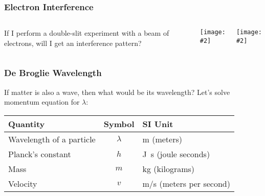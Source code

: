 \documentclass[12pt,compress,aspectratio=169]{beamer}
\newcommand{\pic}[2]{\texttt{[image: \#2]}}
\begin{document}
\begin{frame}
  \frametitle{Electron Interference}
  \begin{columns}
    If I perform a double-slit experiment with a beam of electrons, will I get
    an interference pattern?
    \begin{center}
      \pic{.7}{CNX_Chem_06_03_Electrnin.jpg}
    \end{center}

    \pic{1}{206px-Double-slit_experiment_results_Tanamura_2.jpg}
  \end{columns}
\end{frame}



\begin{frame}
  \frametitle{De Broglie Wavelength}
  If matter is also a wave, then what would be its wavelength? Let's solve
  momentum equation for $\lambda$:


  \vspace{-.1in}
  \begin{center}
    \begin{tabular}{l|c|l}
      \rowcolor{pink}
      \textbf{Quantity} & \textbf{Symbol} & \textbf{SI Unit} \\ \hline
      Wavelength of a particle & $\lambda$ & \si{\metre} (meters) \\
      Planck's constant & $h$  & \si{\joule.\second} (joule seconds) \\
      Mass              & $m$  & \si{\kilo\gram} (kilograms) \\
      Velocity          & $v$  & \si{\metre/\second} (meters per second)
    \end{tabular}
  \end{center}
\end{frame}
\end{document}
